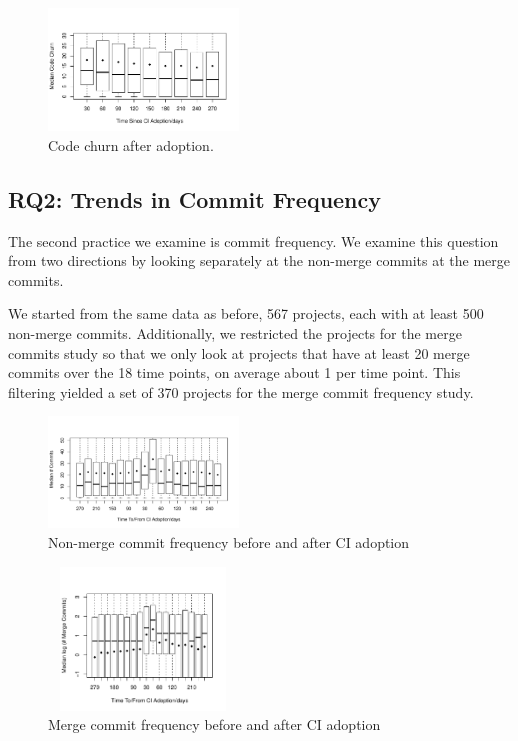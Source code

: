 \begin{figure}[t]
\centering
\includegraphics[width=0.45\textwidth, clip=true, trim=0 15 15 50]{churn_after.pdf}
\caption{Code churn after \Tvis adoption.}
\label{Fig:CodeChurnAfter}\vspace{-0.3cm}
\end{figure}



\subsection{RQ2: Trends in Commit Frequency}

The second practice we examine is commit frequency.
We examine this question from two directions by looking separately at the non-merge commits at the merge commits. 

We started from the same data as before, 567 projects, each with at least 500 
non-merge commits.
Additionally, we restricted the projects for the  merge commits study so that we only look at projects that have at least 20 merge commits over the 18 time points, \ie on average about 1 per time point.
This filtering yielded a set of 370 projects for the merge commit frequency study.

\begin{figure}[!t]
\centering
\includegraphics[width=0.45\textwidth, clip=true, trim=0 15 15 50]{numbercommits.pdf}
\caption{Non-merge commit frequency before and after CI adoption}
\label{Fig:NumberCommits}
\end{figure}

\begin{figure}[!t]
\centering
\includegraphics[width=0.45\textwidth, height=1.5in, clip=true, trim=0 15 15 50]{merges.pdf}
\caption{Merge commit frequency before and after CI adoption}
\label{Fig:MergeCommits}
\end{figure}

